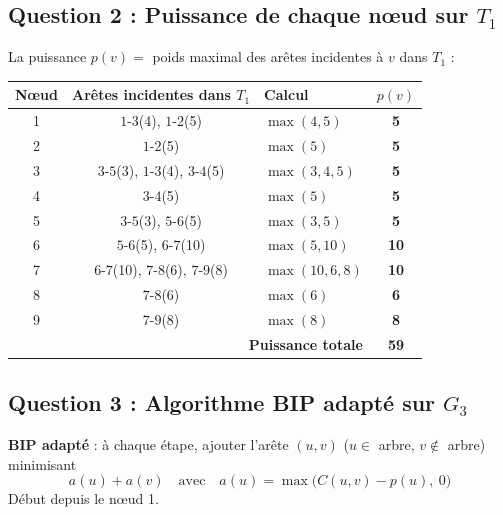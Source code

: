 \documentclass[12pt,a4paper]{article}
\begin{document}
\subsection{Question 2 : Puissance de chaque nœud sur $T_1$}

\begin{solution}
La puissance $p(v)=$ poids maximal des arêtes incidentes à $v$ dans $T_1$ :

\begin{center}
\begin{tabular}{|c|c|l|c|}
\hline
\textbf{Nœud} & \textbf{Arêtes incidentes dans $T_1$} & \textbf{Calcul} & $p(v)$ \\\hline
1 & $1$-$3$(4), $1$-$2$(5) & $\max(4,5)$ & \textbf{5} \\\hline
2 & $1$-$2$(5) & $\max(5)$ & \textbf{5} \\\hline
3 & $3$-$5$(3), $1$-$3$(4), $3$-$4$(5) & $\max(3,4,5)$ & \textbf{5} \\\hline
4 & $3$-$4$(5) & $\max(5)$ & \textbf{5} \\\hline
5 & $3$-$5$(3), $5$-$6$(5) & $\max(3,5)$ & \textbf{5} \\\hline
6 & $5$-$6$(5), $6$-$7$(10) & $\max(5,10)$ & \textbf{10} \\\hline
7 & $6$-$7$(10), $7$-$8$(6), $7$-$9$(8) & $\max(10,6,8)$ & \textbf{10} \\\hline
8 & $7$-$8$(6) & $\max(6)$ & \textbf{6} \\\hline
9 & $7$-$9$(8) & $\max(8)$ & \textbf{8} \\\hline\hline
\multicolumn{3}{|r|}{\textbf{Puissance totale}} & \textbf{59} \\\hline
\end{tabular}
\end{center}
\end{solution}

\subsection{Question 3 : Algorithme BIP adapté sur $G_3$}

\begin{methode}
\textbf{BIP adapté} : à chaque étape, ajouter l'arête $(u,v)$ ($u \in$ arbre, $v \notin$ arbre) minimisant
\[
a(u) + a(v) \quad \text{avec} \quad a(u) = \max\bigl(C(u,v) - p(u),\ 0\bigr)
\]
Début depuis le nœud 1.
\end{methode}
\end{document}

